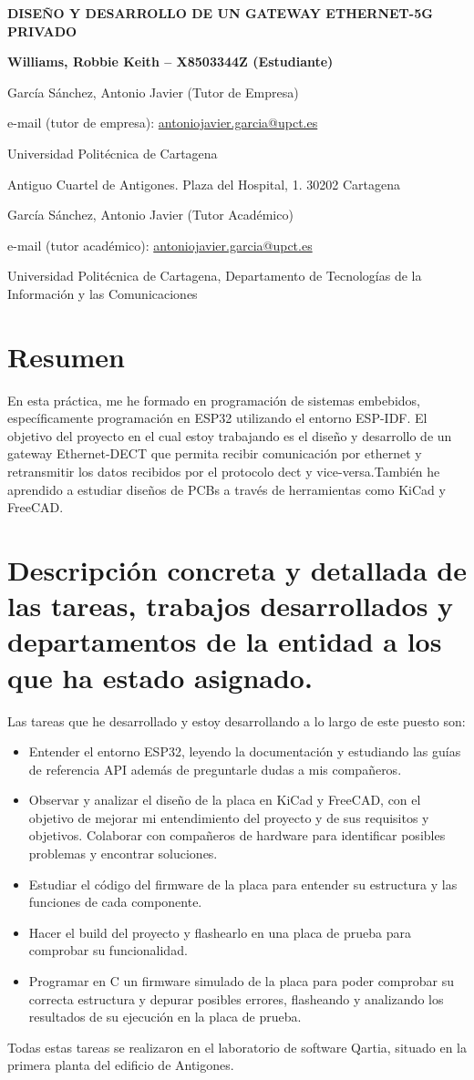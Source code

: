 \documentclass[a4paper,11pt]{article}
\newcommand{\practicatitle}[9]{
    \begin{center}
        \vspace*{11pt}
        
        {\bfseries\MakeUppercase{#1}\par}
        
        \vspace{18pt}
        
        {\bfseries #2\par}
        
        \vspace{6pt}
        
        #3\par
        #4\par
        #5\par
        #6\par
        
        \vspace{12pt}
        
        #7\par
        #8\par
        #9\par
        
        \vspace{18pt}
    \end{center}
}
\begin{document}
\practicatitle
{Diseño y Desarrollo de un gateway Ethernet-5G privado}
{Williams, Robbie Keith – X8503344Z (Estudiante)}
{García Sánchez, Antonio Javier (Tutor de Empresa)}
{e-mail (tutor de empresa): \href{mailto:antoniojavier.garcia@upct.es}{antoniojavier.garcia@upct.es}}
{Universidad Politécnica de Cartagena}
{Antiguo Cuartel de Antigones. Plaza del Hospital, 1. 30202 Cartagena}
{García Sánchez, Antonio Javier (Tutor Académico)}
{e-mail (tutor académico): \href{mailto:antoniojavier.garcia@upct.es}{antoniojavier.garcia@upct.es}}
{Universidad Politécnica de Cartagena, Departamento de Tecnologías de la Información y las Comunicaciones}
\tableofcontents
\newpage
\section*{Resumen}
En esta práctica, me he formado en programación de sistemas embebidos, específicamente programación en ESP32 utilizando el entorno ESP-IDF. El objetivo del proyecto en el cual estoy trabajando es el diseño y desarrollo de un gateway Ethernet-DECT que permita recibir comunicación por ethernet y retransmitir los datos recibidos por el protocolo dect y vice-versa.También he aprendido a estudiar diseños de PCBs a través de herramientas como KiCad y FreeCAD.
\section{Descripción concreta y detallada de las tareas, trabajos desarrollados y departamentos de la entidad a los que ha estado asignado.}
Las tareas que he desarrollado y estoy desarrollando a lo largo de este puesto son:
\begin{itemize}
	\item Entender el entorno ESP32, leyendo la documentación y estudiando las guías de referencia API además de preguntarle dudas a mis compañeros.
	\item Observar y analizar el diseño de la placa en KiCad y FreeCAD, con el objetivo de mejorar mi entendimiento del proyecto y de sus requisitos y objetivos. Colaborar con compañeros de hardware para identificar posibles problemas y encontrar soluciones.
	\item Estudiar el código del firmware de la placa para entender su estructura y las funciones de cada componente.
	\item Hacer el build del proyecto y flashearlo en una placa de prueba para comprobar su funcionalidad.
	\item Programar en C un firmware simulado de la placa para poder comprobar su correcta estructura y depurar posibles errores, flasheando y analizando los resultados de su ejecución en la placa de prueba.
\end{itemize}
Todas estas tareas se realizaron en el laboratorio de software Qartia, situado en la primera planta del edificio de Antigones.
\end{document}
